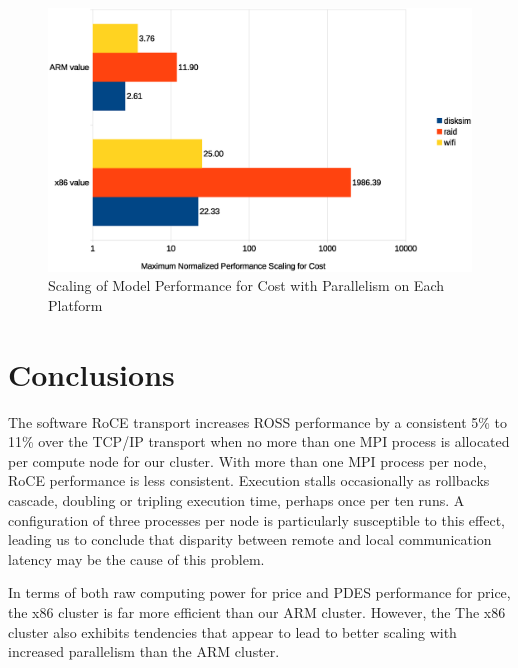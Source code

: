 \documentclass[11pt]{book}
\begin{document}
\begin{figure}
\centering
\includegraphics[width=\textwidth]{costperf_summary}
\caption{Scaling of Model Performance for Cost with Parallelism on Each Platform}
\label{costperf-summary}
\end{figure}


\chapter{Conclusions}\label{conclusions}

The software RoCE transport increases ROSS performance by a consistent 5\% to 11\% over
the TCP/IP transport when no more than one MPI process is allocated per compute node for
our cluster.  With more than one MPI process per node, RoCE performance is less
consistent.  Execution stalls occasionally as rollbacks cascade, doubling or tripling
execution time, perhaps once per ten runs.  A configuration of three processes per node is
particularly susceptible to this effect, leading us to conclude that disparity between
remote and local communication latency may be the cause of this problem.

In terms of both raw computing power for price and PDES performance for price, the x86
cluster is far more efficient than our ARM cluster.  However, the The x86 cluster also
exhibits tendencies that appear to lead to better scaling with increased parallelism than
the ARM cluster.
\end{document}
